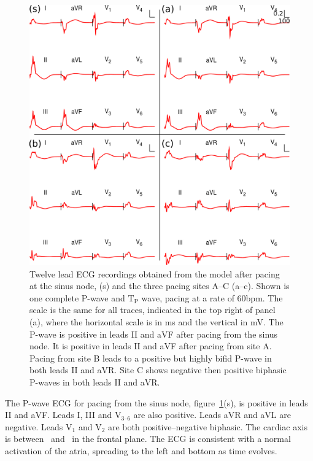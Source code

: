 \begin{figure}
\begin{center}
\includegraphics{figures/forward/inverted_p_wave/inverted_pwave_ecg}
\end{center}
\caption[12 Lead ECG traces from pacing sites along the CT]{
\label{fig:forward:inverse:ecgs}
Twelve lead ECG recordings obtained from the model after pacing at the sinus
node, (s) and the three pacing sites A--C (a--c).
Shown is one complete P-wave and $\text{T}_{\text{P}}$ wave, pacing at a rate of
\unit{60}{bpm}.
The scale is the same for all traces, indicated in the top right of panel (a),
where the horizontal scale is in ms and the vertical in mV.
The P-wave is positive in leads II and aVF after pacing from the sinus node.
It is positive in leads II and aVF after pacing from site A.
Pacing from site B leads to a positive but highly bifid P-wave in both leads II
and aVR.
Site C shows negative then positive biphasic P-waves in both leads II and aVR.
}
\end{figure}


The P-wave ECG for pacing from the sinus node,
figure~\ref{fig:forward:inverse:ecgs}(s), is positive in leads II and aVF.
Leads I, III and $\text{V}_{\text{3--6}}$ are also positive.
Leads aVR and aVL are negative.
Leads $\text{V}_{\text{1}}$ and $\text{V}_{\text{2}}$ are both
positive--negative biphasic.
The cardiac axis is between \ and \ in the frontal plane.
The ECG is consistent with a normal activation of the atria, spreading to the
left and bottom as time evolves.


